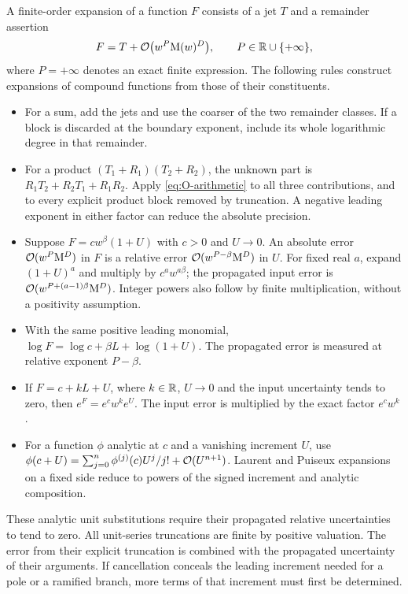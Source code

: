 A finite-order expansion of a function $F$ consists of a jet $T$ and a remainder assertion
\begin{equation}
 F=T+\mathcal O\bigl(w^P\mathrm M(w)^D\bigr),\qquad P\in\mathbb R\cup\{+\infty\},
 \label{eq:triple}
\end{equation}
where $P=+\infty$ denotes an exact finite expression. The following rules construct expansions of compound functions from those of their constituents.
\begin{itemize}[leftmargin=1.6em]
\item For a sum, add the jets and use the coarser of the two remainder classes. If a block is discarded at the boundary exponent, include its whole logarithmic degree in that remainder.
\item For a product $(T_1+R_1)(T_2+R_2)$, the unknown part is $R_1T_2+R_2T_1+R_1R_2$. Apply \eqref{eq:O-arithmetic} to all three contributions, and to every explicit product block removed by truncation. A negative leading exponent in either factor can reduce the absolute precision.
\item Suppose $F=cw^\beta(1+U)$ with $c>0$ and $U\to0$. An absolute error $\mathcal O(w^P\mathrm M^D)$ in $F$ is a relative error $\mathcal O(w^{P-\beta}\mathrm M^D)$ in $U$. For fixed real $a$, expand $(1+U)^a$ and multiply by $c^aw^{a\beta}$; the propagated input error is $\mathcal O(w^{P+(a-1)\beta}\mathrm M^D)$. Integer powers also follow by finite multiplication, without a positivity assumption.
\item With the same positive leading monomial, $\log F=\log c+\beta L+\log(1+U)$. The propagated error is measured at relative exponent $P-\beta$.
\item If $F=c+kL+U$, where $k\in\mathbb R$, $U\to0$ and the input uncertainty tends to zero, then $e^F=e^cw^ke^U$. The input error is multiplied by the exact factor $e^cw^k$.
\item For a function $\phi$ analytic at $c$ and a vanishing increment $U$, use $\phi(c+U)=\sum_{j=0}^{n}\phi^{(j)}(c)U^j/j!+\mathcal O(U^{n+1})$. Laurent and Puiseux expansions on a fixed side reduce to powers of the signed increment and analytic composition.
\end{itemize}
These analytic unit substitutions require their propagated relative uncertainties to tend to zero. All unit-series truncations are finite by positive valuation. The error from their explicit truncation is combined with the propagated uncertainty of their arguments. If cancellation conceals the leading increment needed for a pole or a ramified branch, more terms of that increment must first be determined.

